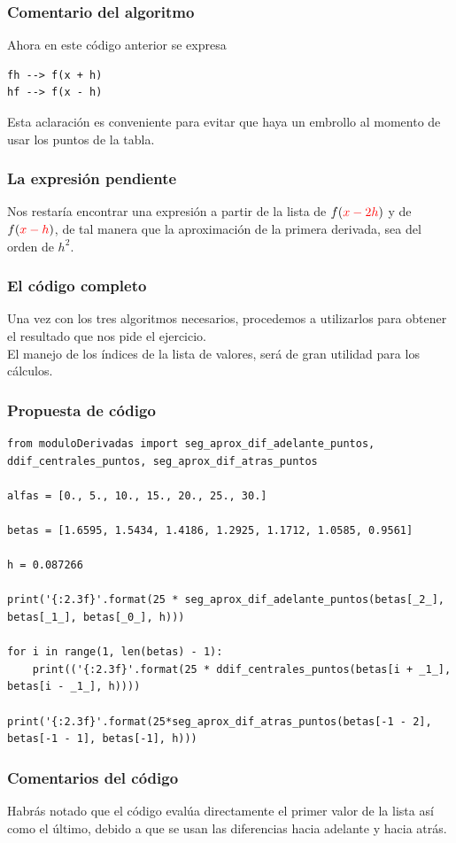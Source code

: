 \begin{frame}[fragile]
\frametitle{Comentario del algoritmo}
Ahora en este código anterior se expresa
\begin{verbatim}
fh --> f(x + h)
hf --> f(x - h)
\end{verbatim}
Esta aclaración es conveniente para evitar que haya un embrollo al momento de usar los puntos de la tabla.
\end{frame}
\begin{frame}
\frametitle{La expresión pendiente}
Nos restaría encontrar una expresión a partir de la lista de $f(\textcolor{red}{x - 2h})$ y de $f(\textcolor{red}{x - h})$, de tal manera que la aproximación de la primera derivada, sea del orden de $h^{2}$.
\end{frame}
\begin{frame}
\frametitle{El código completo}
Una vez con los tres algoritmos necesarios, procedemos a utilizarlos para obtener el resultado que nos pide el ejercicio.
\\
\bigskip
El manejo de los índices de la lista de valores, será de gran utilidad para los cálculos.
\end{frame}
\begin{frame}
\frametitle{Propuesta de código}
\begin{lstlisting}[caption=Propuesta de código completo, style=FormattedNumber, basicstyle=\linespread{1.1}\ttfamily=\small, columns=fullflexible]
from moduloDerivadas import seg_aprox_dif_adelante_puntos, ddif_centrales_puntos, seg_aprox_dif_atras_puntos

alfas = [0., 5., 10., 15., 20., 25., 30.]

betas = [1.6595, 1.5434, 1.4186, 1.2925, 1.1712, 1.0585, 0.9561]

h = 0.087266

print('{:2.3f}'.format(25 * seg_aprox_dif_adelante_puntos(betas[_2_], betas[_1_], betas[_0_], h)))

for i in range(1, len(betas) - 1):
    print(('{:2.3f}'.format(25 * ddif_centrales_puntos(betas[i + _1_], betas[i - _1_], h))))
    
print('{:2.3f}'.format(25*seg_aprox_dif_atras_puntos(betas[-1 - 2], betas[-1 - 1], betas[-1], h)))
\end{lstlisting}    
\end{frame}
\begin{frame}[fragile]
\frametitle{Comentarios del código}
Habrás notado que el código evalúa directamente el primer valor de la lista así como el último, debido a que se usan las diferencias hacia adelante y hacia atrás.
\end{frame}
